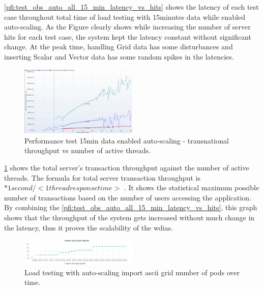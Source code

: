 \documentclass[conference]{IEEEtran}
\begin{document}
\cref{pfi:test_obs_auto_all_15_min_latency_vs_hits} shows the latency of each test case throughout total time of load testing with 15minutes data while enabled auto-scaling. As the Figure clearly shows while increasing the number of server hits for each test case, the system kept the latency constant without significant change. At the peak time, handling Grid data has some disturbances and inserting Scalar and Vector data has some random spikes in the latencies.

\begin{figure}[t!]
\centerline{\includegraphics[width=0.5\textwidth]{results/obs/all_auto/obs_all_auto_15m_transaction_throughtput_vs_threads.png}}
\caption{Performance test 15min data enabled auto-scaling - transnational throughput vs number of active threads.}
\label{pfi:test_obs_auto_all_15_min_throughput_vs_threads}
\end{figure}

\cref{pfi:test_obs_auto_all_15_min_throughput_vs_threads} shows the total server's transaction throughput against the number of active threads.
The formula for total server transaction throughput is \(<active threads> * 1 second / <1  thread response time>\) \cite{JMeterPluginsTransactionPlugin}. It shows the statistical maximum possible number of transactions based on the number of users accessing the application.
By combining the \cref{pfi:test_obs_auto_all_15_min_latency_vs_hits}, this graph shows that the throughput of the system gets increased without much change in the latency, thus it proves the scalability of the \acrshort{wdias}.

\begin{figure}[tb!]
    \centering
    \includegraphics[width=0.5\textwidth]{results/obs/all_auto/obs_all_auto_15m_import_grid_pod.png}
    \caption{Load testing with auto-scaling import ascii grid number of pods over time.}
    \label{pfi:obs_all_auto_15m_import_grid_pod}
\end{figure}
\end{document}
